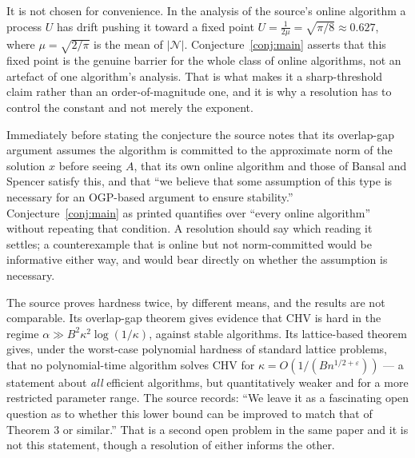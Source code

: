 \documentclass{aicr-conjecture}
\newcommand{\eps}{\varepsilon}
\newcommand{\CHV}{\mathrm{CHV}}
\begin{document}
\begin{remark}\label{rem:constant}
It is not chosen for convenience. In the analysis of the source's online
algorithm a process $U$ has drift pushing it toward a fixed point
$U = \frac{1}{2\mu} = \sqrt{\pi/8} \approx 0.627$, where $\mu =
\sqrt{2/\pi}$ is the mean of $|\mathcal{N}|$.
Conjecture~\ref{conj:main} asserts that this fixed point is the genuine
barrier for the whole class of online algorithms, not an artefact of one
algorithm's analysis. That is what makes it a sharp-threshold claim
rather than an order-of-magnitude one, and it is why a resolution has to
control the constant and not merely the exponent.
\end{remark}

\begin{remark}\label{rem:stability}
Immediately before stating the conjecture the source notes that its
overlap-gap argument assumes the algorithm is committed to the
approximate norm of the solution $x$ before seeing $A$, that its own
online algorithm and those of Bansal and Spencer satisfy this, and that
``we believe that some assumption of this type is necessary for an
OGP-based argument to ensure stability.'' Conjecture~\ref{conj:main} as
printed quantifies over ``every online algorithm'' without repeating that
condition. A resolution should say which reading it settles; a
counterexample that is online but not norm-committed would be
informative either way, and would bear directly on whether the
assumption is necessary.
\end{remark}

\begin{remark}\label{rem:lowerbounds}
The source proves hardness twice, by different means, and the results are
not comparable. Its overlap-gap theorem gives evidence that $\CHV$ is
hard in the regime $\alpha \gg B^{2}\kappa^{2}\log(1/\kappa)$, against
stable algorithms. Its lattice-based theorem gives, under the worst-case
polynomial hardness of standard lattice problems, that no
polynomial-time algorithm solves $\CHV$ for $\kappa =
O(1/(Bn^{1/2+\eps}))$ --- a statement about \emph{all} efficient
algorithms, but quantitatively weaker and for a more restricted parameter
range. The source records: ``We leave it as a fascinating open question
as to whether this lower bound can be improved to match that of
Theorem 3 or similar.'' That is a second open problem in the same paper
and it is not this statement, though a resolution of either informs the
other.
\end{remark}
\end{document}
